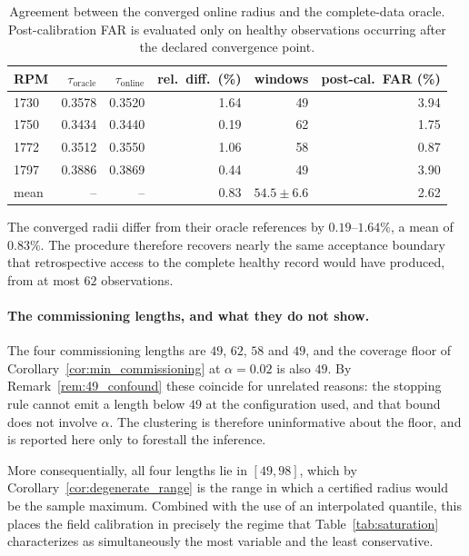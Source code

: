 \documentclass[a4paper]{cas-sc}
\begin{document}
\begin{table}[!ht]
\centering
\caption{Agreement between the converged online radius and the complete-data
oracle. Post-calibration FAR is evaluated only on healthy observations
occurring after the declared convergence point.}
\label{tab:cwru_agreement}
\begin{tabular}{lrrrrr}
\toprule
RPM & \(\tau_{\mathrm{oracle}}\) & \(\tau_{\mathrm{online}}\) & rel.\ diff.\ (\%) & windows & post-cal.\ FAR (\%) \\
\midrule
1730 & 0.3578 & 0.3520 & 1.64 & 49 & 3.94 \\
1750 & 0.3434 & 0.3440 & 0.19 & 62 & 1.75 \\
1772 & 0.3512 & 0.3550 & 1.06 & 58 & 0.87 \\
1797 & 0.3886 & 0.3869 & 0.44 & 49 & 3.90 \\
\midrule
mean & --     & --     & 0.83 & $54.5\pm6.6$ & 2.62 \\
\bottomrule
\end{tabular}
\end{table}

The converged radii differ from their oracle references by
\(0.19\)--\(1.64\%\), a mean of \(0.83\%\). The procedure therefore recovers
nearly the same acceptance boundary that retrospective access to the complete
healthy record would have produced, from at most \(62\) observations.

\paragraph{The commissioning lengths, and what they do not show.}
The four commissioning lengths are \(49\), \(62\), \(58\) and \(49\), and the
coverage floor of Corollary~\ref{cor:min_commissioning} at
\(\alpha=0.02\) is also \(49\). By
Remark~\ref{rem:49_confound} these coincide for unrelated reasons: the
stopping rule cannot emit a length below \(49\) at the configuration used, and
that bound does not involve \(\alpha\). The clustering is therefore
uninformative about the floor, and is reported here only to forestall the
inference.

More consequentially, all four lengths lie in \([49,98]\), which by
Corollary~\ref{cor:degenerate_range} is the range in which a certified radius
would be the sample maximum. Combined with the use of an interpolated
quantile, this places the field calibration in precisely the regime that
Table~\ref{tab:saturation} characterizes as simultaneously the most variable
and the least conservative.
\end{document}
